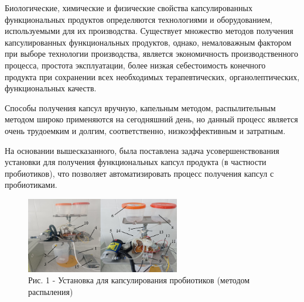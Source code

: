 \begin{multicols}{2}
Биологические, химические и физические свойства капсулированных
функциональных продуктов определяются технологиями и оборудованием,
используемыми для их производства. Существует множество методов
получения капсулированных функциональных продуктов, однако, немаловажным
фактором при выборе технологии производства, является экономичность
производственного процесса, простота эксплуатации, более низкая
себестоимость конечного продукта при сохранении всех необходимых
терапевтических, органолептических, функциональных качеств.

Способы получения капсул вручную, капельным методом, распылительным
методом широко применяются на сегодняшний день, но данный процесс
является очень трудоемким и долгим, соответственно, низкоэффективным и
затратным.

На основании вышесказанного, была поставлена задача усовершенствования
установки для получения функциональных капсул продукта (в частности
пробиотиков), что позволяет автоматизировать процесс получения капсул с
пробиотиками.

\end{multicols}

\begin{figure}[H]
	\centering
	\includegraphics[width=0.6\textwidth]{assets/310}
	\caption*{\normalfont \emph{1- штатив, 2- форсунка, 3- емкость для раствора, 4- панель
	исполнительных устройств, 5- шестеренчатый насос (12 В, 5 А, 100 Вт ), 6
	- емкость для рабочей смеси, 7- гайка регулировки уровня емкостей, 8-
	емкость для промывной жидкости, 9 - однофазное твердотельное реле, 10 -
	циркуляционный насос , 11- переменные резисторы для грубой и тонкой
	регулировки частоты вращения шестеренчатого насоса , 12 - стабилизатор
	постоянного напряжения, модуль LM2596S; 13 - термостат; 14 --
	трубопроводы; 15 -- блок питания 24В, 20А.}}
	\caption*{Рис. 1 - Установка для капсулирования пробиотиков (методом
распыления)}
\end{figure}

